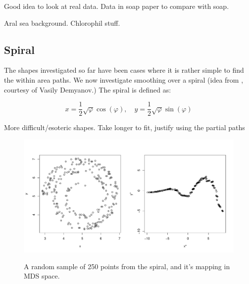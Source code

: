 \documentclass[a4paper,10pt]{article}
\renewcommand{\phi}{\varphi}
\begin{document}
Good idea to look at real data. Data in soap paper to compare with soap.

Aral sea background. Chlorophil stuff.



\subsection{Spiral}

The shapes investigated so far have been cases where it is rather simple to find the within area paths. We now investigate smoothing over a spiral (idea from \cite{spiralpaper}, courtesy of Vasily Demyanov.) The spiral is defined as:

\begin{equation}
x=\frac{1}{2}\sqrt{\phi}\cos(\phi), \quad y=\frac{1}{2}\sqrt{\phi}\sin(\phi)
\end{equation}



More difficult/esoteric shapes. Take longer to fit, justify using the partial paths

\begin{figure}
\centering
\includegraphics[width=6in]{su-figs/spiralmap.pdf} \\
\caption{A random sample of 250 points from the spiral, and it's mapping in MDS space.}
\label{spiralmap}
\end{figure}






\end{document}
